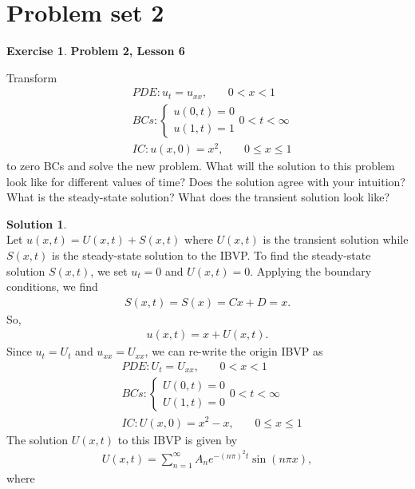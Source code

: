 \documentclass{book}
\theoremstyle{definition}
\newtheorem*{exer*}{Exercise}
\newtheorem*{sln*}{Solution}
\begin{document}
\newpage
\section{Problem set 2}


\begin{exer*}\textbf{Problem 2, Lesson 6}
	
	\noindent Transform
	\begin{align*}
	&PDE: u_t = u_{xx},\,\,\,\,\,\,\,\,\,\,\, 0<x<1\\
	&BCs:  
	\begin{cases}
	u(0,t) = 0\\
	u(1,t) = 1
	\end{cases} 0 < t < \infty\\
	&IC: u(x,0) = x^2,\,\,\,\,\,\,\,\,\,\,\, 0 \leq x\leq 1
	\end{align*}
	to zero BCs and solve the new problem. What will the solution to this problem look like for different values of time? Does the solution agree with your intuition? What is the steady-state solution? What does the transient solution look like?
	\begin{sln*}
		$\,$\\
		Let $u(x,t) = U(x,t) + S(x,t)$ where $U(x,t)$ is the transient solution while $S(x,t)$ is the steady-state solution to the IBVP. To find the steady-state solution $S(x,t)$, we set $u_t = 0$ and $U(x,t) = 0$. Applying the boundary conditions, we find 
		\begin{align*}
		S(x,t) = S(x) = Cx+D = x.
		\end{align*}
		So,
		\begin{align*}
		u(x,t) = x + U(x,t).
		\end{align*}
		Since $u_t = U_t$ and $u_{xx} = U_{xx}$, we can re-write the origin IBVP as
		\begin{align*}
		&PDE: U_t = U_{xx},\,\,\,\,\,\,\,\,\,\,\, 0<x<1\\
		&BCs:  
		\begin{cases}
		U(0,t) = 0\\
		U(1,t) = 0
		\end{cases} 0 < t < \infty\\
		&IC: U(x,0) = x^2 - x,\,\,\,\,\,\,\,\,\,\,\, 0 \leq x\leq 1
		\end{align*}
		The solution $U(x,t)$ to this IBVP is given by
		\begin{align*}
		U(x,t) = \sum^\infty_{n=1}A_n e^{-(n\pi)^2t} \sin(n\pi x),
		\end{align*}
		where
		\begin{align*}

\end{align*}
\end{sln*}
\end{exer*}
\end{document}
